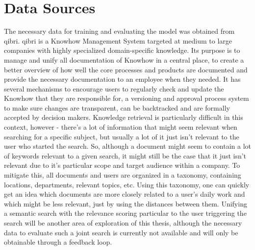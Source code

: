 \documentclass[draft,final]{vutinfth} %
\begin{document}
\section{Data Sources}
The necessary data for training and evaluating the model was obtained from qibri.
qibri is a Knowhow Management System targeted at medium to large companies with highly specialized domain-specific knowledge. Its purpose is to manage and unify all documentation of Knowhow in a central place, to create a better overview of how well the core processes and products are documented and provide the necessary documentation to an employee when they needed. It has several mechanisms to encourage users to regularly check and update the Knowhow that they are responsible for, a versioning and approval process system to make sure changes are transparent, can be backtracked and are formally accepted by decision makers. Knowledge retrieval is particularly difficult in this context, however - there's a lot of information that might seem relevant when searching for a specific subject, but usually a lot of it just isn't relevant to the user who started the search. So, although a document might seem to contain a lot of keywords relevant to a given search, it might still be the case that it just isn't relevant due to it's particular scope and target audience within a company. To mitigate this, all documents and users are organized in a taxonomy, containing locations, departments, relevant topics, etc. Using this taxonomy, one can quickly get an idea which documents are more closely related to a user's daily work and which might be less relevant, just by using the distances between them. Unifying a semantic search with the relevance scoring particular to the user triggering the search will be another area of exploration of this thesis, although the necessary data to evaluate such a joint search is currently not available and will only be obtainable through a feedback loop.
\end{document}
